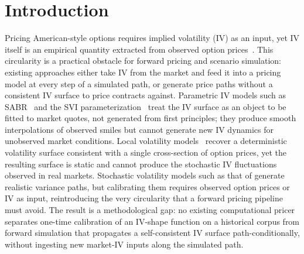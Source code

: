\section{Introduction}\label{sec:introduction}

Pricing American-style options requires implied volatility (IV) as an input, yet IV itself is an empirical quantity extracted from observed option prices~\cite{black1973}. This circularity is a practical obstacle for forward pricing and scenario simulation: existing approaches either take IV from the market and feed it into a pricing model at every step of a simulated path, or generate price paths without a consistent IV surface to price contracts against. Parametric IV models such as SABR~\cite{hagan2002} and the SVI parameterization~\cite{gatheral2004} treat the IV surface as an object to be fitted to market quotes, not generated from first principles; they produce smooth interpolations of observed smiles but cannot generate new IV dynamics for unobserved market conditions. Local volatility models~\cite{dupire1994,derman1994} recover a deterministic volatility surface consistent with a single cross-section of option prices, yet the resulting surface is static and cannot produce the stochastic IV fluctuations observed in real markets. Stochastic volatility models such as that of \citet{heston1993} generate realistic variance paths, but calibrating them requires observed option prices or IV as input, reintroducing the very circularity that a forward pricing pipeline must avoid. The result is a methodological gap: no existing computational pricer separates one-time calibration of an IV-shape function on a historical corpus from forward simulation that propagates a self-consistent IV surface path-conditionally, without ingesting new market-IV inputs along the simulated path.

